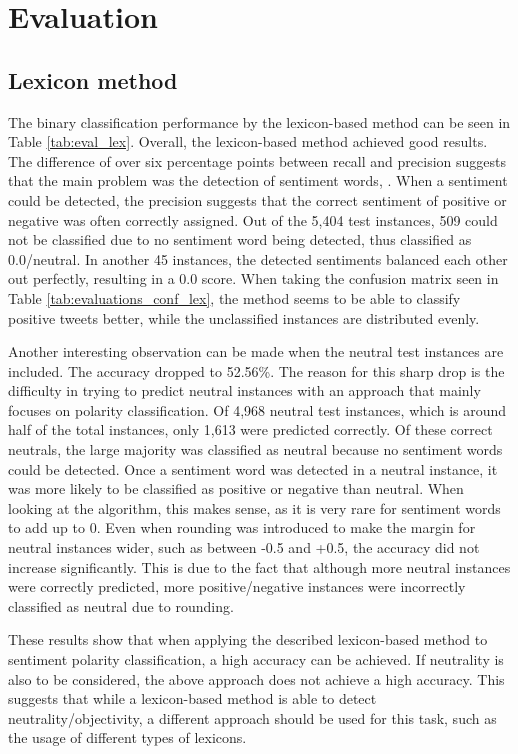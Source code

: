 \chapter{Evaluation}
\section{Lexicon method}

The binary classification performance by the lexicon-based method can be seen in Table \ref{tab:eval_lex}. Overall, the lexicon-based method achieved good results. The difference of over six percentage points between recall and precision suggests that the main problem was the detection of sentiment words, . When a sentiment could be detected, the precision suggests that the correct sentiment of positive or negative was often correctly assigned. Out of the 5,404 test instances, 509 could not be classified due to no sentiment word being detected, thus classified as 0.0/neutral. In another 45 instances, the detected sentiments balanced each other out perfectly, resulting in a 0.0 score. When taking the confusion matrix seen in Table \ref{tab:evaluations_conf_lex}, the method seems to be able to classify positive tweets better, while the unclassified instances are distributed evenly. 

Another interesting observation can be made when the neutral test instances are included. The accuracy dropped to 52.56\%. The reason for this sharp drop is the difficulty in trying to predict neutral instances with an approach that mainly focuses on polarity classification. Of 4,968 neutral test instances, which is around half of the total instances, only 1,613 were predicted correctly. Of these correct neutrals, the large majority was classified as neutral because no sentiment words could be detected. Once a sentiment word was detected in a neutral instance, it was more likely to be classified as positive or negative than neutral. When looking at the algorithm, this makes sense, as it is very rare for sentiment words to add up to 0. Even when rounding was introduced to make the margin for neutral instances wider, such as between -0.5 and +0.5, the accuracy did not increase significantly. This is due to the fact that although more neutral instances were correctly predicted, more positive/negative instances were incorrectly classified as neutral due to rounding.

These results show that when applying the described lexicon-based method to sentiment polarity classification, a high accuracy can be achieved. If neutrality is also to be considered, the above approach does not achieve a high accuracy. This suggests that while a lexicon-based method is able to detect neutrality/objectivity, a different approach should be used for this task, such as the usage of different types of lexicons.

